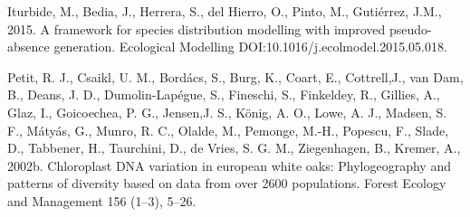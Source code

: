 \documentclass[10pt,a4paper]{article}\usepackage[]{graphicx}\usepackage[]{color}
\begin{document}
Iturbide, M., Bedia, J., Herrera, S., del Hierro, O., Pinto, M., Gutiérrez, J.M., 2015. A framework for
species distribution modelling with improved pseudo-absence generation. Ecological Modelling DOI:10.1016/j.ecolmodel.2015.05.018.


Petit, R. J., Csaikl, U. M., Bordács, S., Burg, K., Coart, E., Cottrell,J., van Dam, B., Deans, J. D., Dumolin-Lapégue, S., Fineschi, S., Finkeldey, R., Gillies, A., Glaz, I., Goicoechea, P. G., Jensen,J. S., König, A. O., Lowe, A. J., Madsen, S. F., Mátyás, G., Munro, R. C., Olalde, M., Pemonge, M.-H., Popescu, F., Slade, D., Tabbener, H., Taurchini, D., de Vries, S. G. M., Ziegenhagen, B., Kremer, A., 2002b. Chloroplast DNA variation in european white oaks: Phylogeography and patterns of diversity based on data from over 2600 populations. Forest Ecology and Management 156 (1–3), 5–26.
\end{document}
